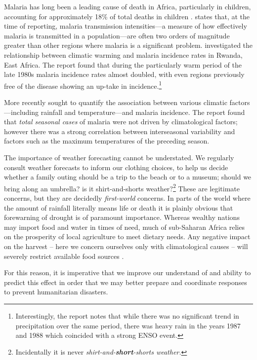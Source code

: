 Malaria has long been a leading cause of death in Africa, particularly in
children, accounting for approximately 18\% of total deaths in children
\citep{IMHE2016}. \citet{Alles1998} states that, at the time of reporting,
malaria transmission intensities---a measure of how effectively malaria is
transmitted in a population---are often two orders of magnitude greater than other
regions where malaria is a significant problem. \citet{loevinsohn1994}
investigated the relationship between climatic warming and malaria incidence
rates in Rwanda, East Africa. The report found that during the particularly warm
period of the late 1980s malaria incidence rates almost doubled, with even
regions previously free of the disease showing an up-take in
incidence.\footnote{Interestingly, the report notes that while there was no
  significant trend in precipitation over the same period, there was heavy rain
  in the years 1987 and 1988 which coincided with a strong ENSO event.}

More recently \cite{craig2004} sought to quantify the association between
various climatic factors---including rainfall and temperature---and malaria
incidence. The report found that \emph{total seasonal cases} of malaria were not
driven by climatological factors; however there was a strong correlation between
interseasonal variability and factors such as the maximum temperatures of the
preceding season.

\vspace{0.5cm}

The importance of weather forecasting cannot be understated. We regularly
consult weather forecasts to inform our clothing choices, to help us decide
whether a family outing should be a trip to the beach or to a museum; should we
bring along an umbrella? is it shirt-and-shorts weather?\footnote{Incidentally
  it is never \emph{shirt-and-\textbf{short}-shorts weather.}} These are
legitimate concerns, but they are decidedly \emph{first-world} concerns. In
parts of the world where the amount of rainfall literally means life or death it
is plainly obvious that forewarning of drought is of paramount importance.
Whereas wealthy nations may import food and water in times of need, much of
sub-Saharan Africa relies on the prosperity of local agriculture to meet dietary
needs. Any negative impact on the harvest -- here we concern ourselves only with
climatological causes -- will severely restrict available food sources
\citep{development2006mapping}.

For this reason, it is imperative that we improve our understand of and ability
to predict this effect in order that we may better prepare and coordinate
responses to prevent humanitarian disasters.

